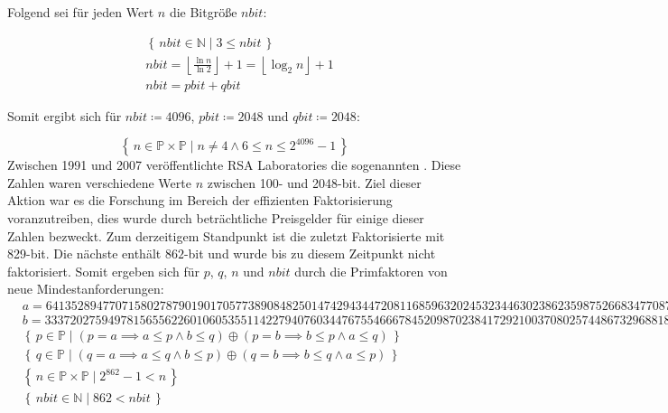 Folgend sei für jeden Wert $n$ die Bitgröße $nbit$:

\begin{equation}
  \begin{split}
    &\left\{\,nbit \in \mathbb{N}\mid 3 \le nbit\, \right\}\\
    &nbit=\left\lfloor\frac{\ln{n}}{\ln{2}}\right\rfloor+1=\left\lfloor\log_2{n}\right\rfloor+1\\
    &nbit=pbit+qbit
  \end{split}
\end{equation}

Somit ergibt sich für $nbit\coloneq4096$, $pbit\coloneq2048$ und $qbit\coloneq2048$:

\begin{equation}
  \left\{\,n \in \mathbb{P} \times \mathbb{P}\mid n \ne 4 \land 6 \le n \le 2^{4096}-1\, \right\}
\end{equation}
\newpage
Zwischen 1991 und 2007 veröffentlichte RSA Laboratories die sogenannten . Diese Zahlen waren verschiedene Werte $n$ zwischen 100- und 2048-bit. Ziel dieser Aktion war es die Forschung im Bereich der effizienten Faktorisierung voranzutreiben, dies wurde durch beträchtliche Preisgelder für einige dieser Zahlen bezweckt. Zum derzeitigem Standpunkt ist  die zuletzt Faktorisierte  mit 829-bit\cite{rsa250}. Die nächste   enthält $862$-bit und wurde bis zu diesem Zeitpunkt nicht faktorisiert. Somit ergeben sich für $p$, $q$, $n$ und $nbit$ durch die Primfaktoren von  neue Mindestanforderungen:
\begin{equation}
  \begin{split}
    &{\scriptscriptstyle a=64135289477071580278790190170577389084825014742943447208116859632024532344630238623598752668347708737661925585694639798853367}\\
    &{\scriptscriptstyle b=33372027594978156556226010605355114227940760344767554666784520987023841729210037080257448673296881877565718986258036932062711}\\
    &\left\{\,p \in \mathbb{P}\mid (p=a \implies a \le p \land b \le q) \oplus (p=b \implies b \le p \land a \le q)\, \right\}\\
    &\left\{\,q \in \mathbb{P}\mid (q=a \implies a \le q \land b \le p) \oplus (q=b \implies b \le q \land a \le p)\, \right\}\\
    &\left\{\,n \in \mathbb{P} \times \mathbb{P}\mid 2^{862}-1 < n\, \right\}\\
    &\left\{\,nbit \in \mathbb{N}\mid 862 < nbit\, \right\}
  \end{split}
\end{equation}

